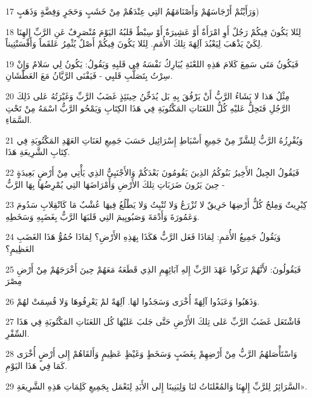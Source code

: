 \par 17 وَرَأَيْتُمْ أَرْجَاسَهُمْ وَأَصْنَامَهُمُ التِي عِنْدَهُمْ مِنْ خَشَبٍ وَحَجَرٍ وَفِضَّةٍ وَذَهَبٍ)
\par 18 لِئَلا يَكُونَ فِيكُمْ رَجُلٌ أَوِ امْرَأَةٌ أَوْ عَشِيرَةٌ أَوْ سِبْطٌ قَلبُهُ اليَوْمَ مُنْصَرِفٌ عَنِ الرَّبِّ إِلهِنَا لِكَيْ يَذْهَبَ لِيَعْبُدَ آلِهَةَ تِلكَ الأُمَمِ. لِئَلا يَكُونَ فِيكُمْ أَصْلٌ يُثْمِرُ عَلقَماً وَأَفْسَنْتِيناً.
\par 19 فَيَكُونُ مَتَى سَمِعَ كَلامَ هَذِهِ اللعْنَةِ يُبَارِكُ نَفْسَهُ فِي قَلبِهِ وَيَقُولُ: يَكُونُ لِي سَلامٌ وَإِنْ سِرْتُ بِتَصَلُّبِ قَلبِي - فَيَفْنَى الرَّيَّانُ مَعَ العَطْشَانِ.
\par 20 مِثْلُ هَذا لا يَشَاءُ الرَّبُّ أَنْ يَرْفُقَ بِهِ بَل يُدَخِّنُ حِينَئِذٍ غَضَبُ الرَّبِّ وَغَيْرَتُهُ عَلى ذَلِكَ الرَّجُلِ فَتَحِلُّ عَليْهِ كُلُّ اللعَنَاتِ المَكْتُوبَةِ فِي هَذَا الكِتَابِ وَيَمْحُو الرَّبُّ اسْمَهُ مِنْ تَحْتِ السَّمَاءِ.
\par 21 وَيُفْرِزُهُ الرَّبُّ لِلشَّرِّ مِنْ جَمِيعِ أَسْبَاطِ إِسْرَائِيل حَسَبَ جَمِيعِ لعَنَاتِ العَهْدِ المَكْتُوبَةِ فِي كِتَابِ الشَّرِيعَةِ هَذَا.
\par 22 فَيَقُولُ الجِيلُ الأَخِيرُ بَنُوكُمُ الذِينَ يَقُومُونَ بَعْدَكُمْ وَالأَجْنَبِيُّ الذِي يَأْتِي مِنْ أَرْضٍ بَعِيدَةٍ حِينَ يَرُونَ ضَرَبَاتِ تِلكَ الأَرْضِ وَأَمْرَاضَهَا التِي يُمْرِضُهَا بِهَا الرَّبُّ -
\par 23 كِبْرِيتٌ وَمِلحٌ كُلُّ أَرْضِهَا حَرِيقٌ لا تُزْرَعُ وَلا تُنْبِتُ وَلا يَطْلُعُ فِيهَا عُشْبٌ مَا كَانْقِلابِ سَدُومَ وَعَمُورَةَ وَأَدْمَةَ وَصَبُويِيمَ التِي قَلبَهَا الرَّبُّ بِغَضَبِهِ وَسَخَطِهِ.
\par 24 وَيَقُولُ جَمِيعُ الأُمَمِ: لِمَاذَا فَعَل الرَّبُّ هَكَذَا بِهَذِهِ الأَرْضِ؟ لِمَاذَا حُمُوُّ هَذَا الغَضَبِ العَظِيمِ؟
\par 25 فَيَقُولُونَ: لأَنَّهُمْ تَرَكُوا عَهْدَ الرَّبِّ إِلهِ آبَائِهِمِ الذِي قَطَعَهُ مَعَهُمْ حِينَ أَخْرَجَهُمْ مِنْ أَرْضِ مِصْرَ
\par 26 وَذَهَبُوا وَعَبَدُوا آلِهَةً أُخْرَى وَسَجَدُوا لهَا. آلِهَةً لمْ يَعْرِفُوهَا وَلا قُسِمَتْ لهُمْ.
\par 27 فَاشْتَعَل غَضَبُ الرَّبِّ عَلى تِلكَ الأَرْضِ حَتَّى جَلبَ عَليْهَا كُل اللعَنَاتِ المَكْتُوبَةِ فِي هَذَا السِّفْرِ.
\par 28 وَاسْتَأْصَلهُمُ الرَّبُّ مِنْ أَرْضِهِمْ بِغَضَبٍ وَسَخَطٍ وَغَيْظٍ عَظِيمٍ وَأَلقَاهُمْ إِلى أَرْضٍ أُخْرَى كَمَا فِي هَذَا اليَوْمِ.
\par 29 السَّرَائِرُ لِلرَّبِّ إِلهِنَا وَالمُعْلنَاتُ لنَا وَلِبَنِينَا إِلى الأَبَدِ لِنَعْمَل بِجَمِيعِ كَلِمَاتِ هَذِهِ الشَّرِيعَةِ».

